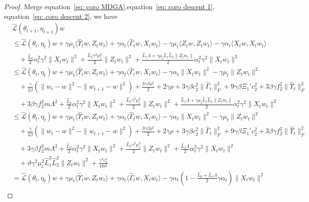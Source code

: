 \documentclass[twoside]{article} %
\def\eqref#1{equation~\ref{#1}}
\theoremstyle{plain}
\theoremstyle{definition}
\theoremstyle{remark}
\newcommand{\HGamma}{\hat{\Gamma}}
\newcommand{\HUpsilon}{\hat{\Upsilon}}
\newcommand{\hL}{\hat{L}}
\newcommand{\fhL}{\hat{\mathcal{L}}}
\begin{document}
\begin{proof}
Merge \eqref{eq: coro MDGA},\eqref{eq: coro descent 1}, \eqref{eq: coro descent 2}, we have
\begin{align}
    &\fhL(\theta_{t+1},\eta_{t+1})w\nonumber\\
    &\leq \fhL(\theta_t, \eta_t)w +{\gamma\mu_t} \langle{\HUpsilon}_tw,Z_tw_t\rangle+\gamma\alpha_t \langle\HGamma_tw,X_tw_t \rangle-{\gamma\mu_t}\langle{Z}_tw,Z_tw_t \rangle - \gamma\alpha_t \langle {{X}_tw},X_tw_t \rangle \nonumber\\
    &\quad + \frac{\hL_0}{2}\alpha_t^2\gamma^2\|X_tw_t\|^2+ \frac{\hL_2\gamma^2\mu_t^2}{2}\|Z_tw_t\|^2+ \frac{\hL_1\Lambda+{\gamma\mu_t \hL_1\hL_2\|Z_tw_t\|}}{2}\alpha_t^2\gamma^2\| X_tw_t \|^2\nonumber\\
    &\leq  \fhL(\theta_t, \eta_t)w +{\gamma\mu_t} \langle{\HUpsilon}_tw,Z_tw_t\rangle+\gamma\alpha_t \langle\HGamma_tw,X_tw_t \rangle -\gamma\alpha_t \|X_tw_t\|^2-\gamma\mu_t\| Z_tw_t\|^2 \nonumber\\
    &\quad +\frac{\gamma}{2\beta}(\|w_t-w\|^2-\|w_{t+1}-w\|^2)+\frac{3\gamma\beta\rho^2}{2}+2\gamma\rho + 3\gamma\beta c_2^2\|\HGamma_t\|_F^2 + 9\gamma\beta\Xi_1'c_2^2+ 3\beta\gamma{f_2^2}\|\HUpsilon_t\|_F^2\nonumber\\
    &\quad +3\beta\gamma{f_2^2}m\Lambda^2+ \frac{\hL_0}{2}\alpha_t^2\gamma^2\|X_tw_t\|^2+ \frac{\hL_2\gamma^2\mu_t^2}{2}\|Z_tw_t\|^2+ \frac{\hL_1\Lambda+{\gamma\mu_t \hL_1\hL_2\|Z_tw_t\|}}{2}\alpha_t^2\gamma^2\| X_tw_t \|^2\nonumber\\
    &\leq \fhL(\theta_t, \eta_t)w +{\gamma\mu_t} \langle{\HUpsilon}_tw,Z_tw_t\rangle+\gamma\alpha_t \langle\HGamma_tw,X_tw_t \rangle -\gamma\alpha_t \|X_tw_t\|^2-\gamma\mu_t\| Z_tw_t\|^2 \nonumber\\
    &\quad +\frac{\gamma}{2\beta}(\|w_t-w\|^2-\|w_{t+1}-w\|^2)+\frac{3\gamma\beta\rho^2}{2}+2\gamma\rho + 3\gamma\beta c_2^2\|\HGamma_t\|_F^2 + 9\gamma\beta\Xi_1'c_2^2+ 3\beta\gamma{f_2^2}\|\HUpsilon_t\|_F^2\nonumber\\
    &\quad +3\gamma\beta{f_2^2}m\Lambda^2+ \frac{\hL_0}{2}\alpha_t^2\gamma^2\|X_tw_t\|^2+ \frac{\hL_2\gamma^2\mu_t^2}{2}\|Z_tw_t\|^2+ \frac{\hL_1\Lambda}{2}\alpha_t^2\gamma^2\| X_tw_t \|^2 \nonumber\\
    &\quad+\vartheta\gamma^2\mu_t^2\hL_1^2\hL_2^2\|Z_tw_t\|^2+\frac{\gamma^4c_2^4}{16\vartheta}\nonumber\\
    &=\fhL(\theta_t,\eta_t)w+{\gamma\mu_t} \langle{\HUpsilon}_tw,Z_tw_t\rangle+\gamma\alpha_t \langle\HGamma_tw,X_tw_t \rangle-\gamma\alpha_t(1-\frac{\hL_0+\hL_1\Lambda}{2}\gamma\alpha_t)\|X_tw_t\|^2\nonumber\\

\end{align}
\end{proof}
\end{document}
